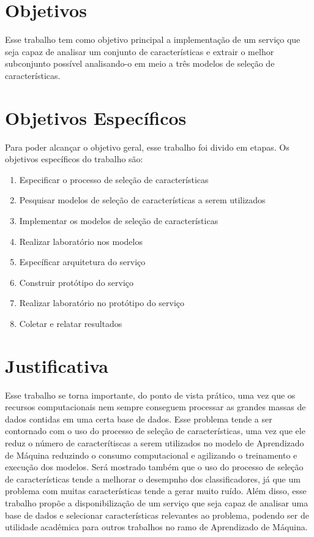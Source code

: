 \section{Objetivos}

Esse trabalho tem como objetivo principal a implementação de um serviço que seja capaz de analisar um conjunto de características e extrair o melhor subconjunto possível analisando-o em meio a três modelos de seleção de características.

\section{Objetivos Específicos}

Para poder alcançar o objetivo geral, esse trabalho foi divido em etapas. Os objetivos específicos do trabalho são:

\begin{enumerate}
	\item{Especificar o processo de seleção de características}
	\item{Pesquisar modelos de seleção de características a serem utilizados}
	\item{Implementar os modelos de seleção de características}
	\item{Realizar laboratório nos modelos}
	\item{Específicar arquitetura do serviço}
	\item{Construir protótipo do serviço}
	\item{Realizar laboratório no protótipo do serviço}
	\item{Coletar e relatar resultados}
\end{enumerate}


\section{Justificativa}

Esse trabalho se torna importante, do ponto de vista prático, uma vez que os recursos computacionais nem sempre conseguem processar as grandes massas de dados contidas em uma certa base de dados. Esse problema tende a ser contornado com o uso do processo de seleção de características, uma vez que ele reduz o número de caracterítiscas a serem utilizados no modelo de Aprendizado de Máquina reduzindo o consumo computacional e agilizando o treinamento e execução dos modelos. Será mostrado também que o uso do processo de seleção de características tende a melhorar o desempnho dos classificadores, já que um problema com muitas características tende a gerar muito ruído. Além disso, esse trabalho propõe a disponibilização de um serviço que seja capaz de analisar uma base de dados e selecionar características relevantes ao problema, podendo ser de utilidade acadêmica para outros trabalhos no ramo de Aprendizado de Máquina.

